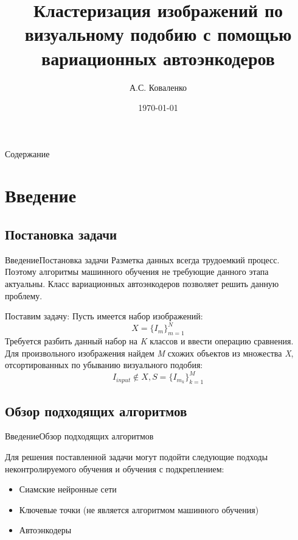 \documentclass{beamer}
\title[Неконтролируемое обучение]{Кластеризация изображений по визуальному подобию с помощью вариационных автоэнкодеров}
\author{А.С. Коваленко}
\institute{ЮФУ}
\date{\today}
\begin{document}
	
	\begin{frame}
	\titlepage
\end{frame}

\begin{frame}{Содержание}
\tableofcontents
\end{frame}

\section{Введение}

\subsection{Постановка задачи}
\begin{frame}{Введение}{Постановка задачи}
Разметка данных всегда трудоемкий процесс. Поэтому алгоритмы машинного обучения не требующие данного этапа актуальны. Класс вариационных автоэнкодеров позволяет решить данную проблему.\\

\begin{block}{Поставим задачу:}
Пусть имеется набор изображений:
\begin{equation}\label{eq:X}
X = \{I_m\}_{m = 1}^{N}
\end{equation}
Требуется разбить данный набор на \textit{K} классов и ввести операцию сравнения.\\
Для произвольного изображения найдем \textit{M} схожих объектов из множества \textit{X}, отсортированных по убыванию визуального подобия:
$$I_{input} \notin X,  S = \{I_{m_k}\}_{k=1}^M$$
\end{block}

\end{frame}

\subsection{Обзор подходящих алгоритмов}



\begin{frame}{Введение}{Обзор подходящих алгоритмов}

Для решения поставленной задачи могут подойти следующие подходы неконтролируемого обучения и обучения с подкреплением:
\begin{itemize}
\item Сиамские нейронные сети
\item Ключевые точки (не является алгоритмом машинного обучения)
\item Автоэнкодеры
\end{itemize}

\end{frame}
\end{document}
